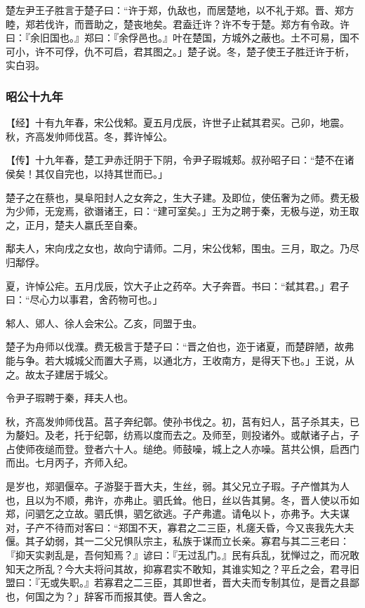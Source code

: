 \documentclass[]{article}
\begin{document}
楚左尹王子胜言于楚子曰：``许于郑，仇敌也，而居楚地，以不礼于郑。晋、郑方睦，郑若伐许，而晋助之，楚丧地矣。君盍迁许？许不专于楚。郑方有令政。许曰：『余旧国也。』郑曰：『余俘邑也。』叶在楚国，方城外之蔽也。土不可易，国不可小，许不可俘，仇不可启，君其图之。」楚子说。冬，楚子使王子胜迁许于析，实白羽。

\hypertarget{header-n2671}{%
\subsubsection{昭公十九年}\label{header-n2671}}

【经】十有九年春，宋公伐邾。夏五月戊辰，许世子止弑其君买。己卯，地震。秋，齐高发帅师伐莒。冬，葬许悼公。

【传】十九年春，楚工尹赤迁阴于下阴，令尹子瑕城郏。叔孙昭子曰：``楚不在诸侯矣！其仅自完也，以持其世而已。」

楚子之在蔡也，狊阜阳封人之女奔之，生大子建。及即位，使伍奢为之师。费无极为少师，无宠焉，欲谮诸王，曰：``建可室矣。」王为之聘于秦，无极与逆，劝王取之，正月，楚夫人嬴氏至自秦。

鄅夫人，宋向戌之女也，故向宁请师。二月，宋公伐邾，围虫。三月，取之。乃尽归鄅俘。

夏，许悼公疟。五月戊辰，饮大子止之药卒。大子奔晋。书曰：``弑其君。」君子曰：``尽心力以事君，舍药物可也。」

邾人、郳人、徐人会宋公。乙亥，同盟于虫。

楚子为舟师以伐濮。费无极言于楚子曰：``晋之伯也，迩于诸夏，而楚辟陋，故弗能与争。若大城城父而置大子焉，以通北方，王收南方，是得天下也。」王说，从之。故太子建居于城父。

令尹子瑕聘于秦，拜夫人也。

秋，齐高发帅师伐莒。莒子奔纪鄣。使孙书伐之。初，莒有妇人，莒子杀其夫，已为嫠妇。及老，托于纪鄣，纺焉以度而去之。及师至，则投诸外。或献诸子占，子占使师夜缒而登。登者六十人。缒绝。师鼓噪，城上之人亦噪。莒共公惧，启西门而出。七月丙子，齐师入纪。

是岁也，郑驷偃卒。子游娶于晋大夫，生丝，弱。其父兄立子瑕。子产憎其为人也，且以为不顺，弗许，亦弗止。驷氏耸。他日，丝以告其舅。冬，晋人使以币如郑，问驷乞之立故。驷氏惧，驷乞欲逃。子产弗遣。请龟以卜，亦弗予。大夫谋对，子产不待而对客曰：``郑国不天，寡君之二三臣，札瘥夭昏，今又丧我先大夫偃。其子幼弱，其一二父兄惧队宗主，私族于谋而立长亲。寡君与其二三老曰：『抑天实剥乱是，吾何知焉？』谚曰：『无过乱门。』民有兵乱，犹惮过之，而况敢知天之所乱？今大夫将问其故，抑寡君实不敢知，其谁实知之？平丘之会，君寻旧盟曰：『无或失职。』若寡君之二三臣，其即世者，晋大夫而专制其位，是晋之县鄙也，何国之为？」辞客币而报其使。晋人舍之。
\end{document}

